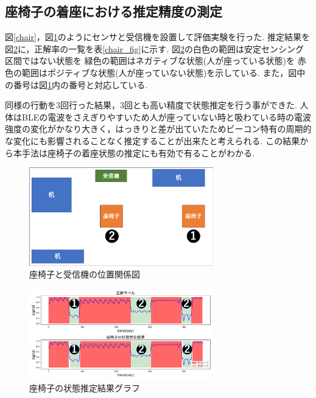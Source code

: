 \documentclass[Japanese]{dicomopapers}
\begin{document}
\subsection{座椅子の着座における推定精度の測定}

図\ref{chair}，図\ref{zaisu_position}のようにセンサと受信機を設置して評価実験を行った.
推定結果を図\ref{chair_graph}に，正解率の一覧を表\ref{chair_fig}に示す.
図\ref{chair_graph}の白色の範囲は安定センシング区間ではない状態を 緑色の範囲はネガティブな状態(人が座っている状態)を 赤色の範囲はポジティブな状態(人が座っていない状態)を示している.
また，図中の番号は図\ref{zaisu_position}内の番号と対応している.


同様の行動を3回行った結果，3回とも高い精度で状態推定を行う事ができた.
人体はBLEの電波をさえぎりやすいため人が座っていない時と吸わている時の電波強度の変化がかなり大きく，はっきりと差が出ていたためビーコン特有の周期的な変化にも影響されることなく推定することが出来たと考えられる.
この結果から本手法は座椅子の着座状態の推定にも有効で有ることがわかる.



\begin{figure}[ht]
    \centering
    \includegraphics[width=8cm]{zaisu_position.png}
    \caption{座椅子と受信機の位置関係図}
    \label{zaisu_position}
\end{figure}

\begin{figure}[ht]
    \centering
    \includegraphics[width=8cm]{zaisu_graph.png}
    \caption{座椅子の状態推定結果グラフ}
    \label{chair_graph}
\end{figure}
\end{document}
